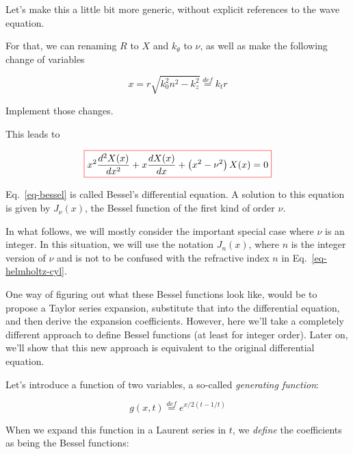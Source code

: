 Let's make this a little bit more generic, without explicit references to the wave equation.

For that, we can renaming $R$ to $X$ and $k_\theta$ to $\nu$, as well as make the following change of variables

\begin{equation}
x = r \sqrt{k_0^2 n^2 - k_z^2} \stackrel{def}{=} k_t r
\end{equation}

\begin{cue}
  Implement those changes.
\end{cue}

This leads to

\begin{equation}
\fbox{$\displaystyle
x^2\frac{d^2 X(x)}{d x^2} + x \frac{d X(x)}{d x} + \left(x ^ 2 - \nu^2 \right)X(x) = 0 \label{eq-bessel}
$}
\end{equation}

Eq.~\ref{eq-bessel} is called Bessel's differential equation. A solution to this equation is given by $J_\nu(x)$, the Bessel function of the first kind of order $\nu$.

In what follows, we will mostly consider the important special case where $\nu$ is an integer. In this situation, we will use the notation $J_n(x)$, where $n$ is the integer version of $\nu$ and is not to be confused with the refractive index $n$ in Eq.~\ref{eq-helmholtz-cyl}.


One way of figuring out what these Bessel functions look like, would be to propose a Taylor series expansion, substitute that into the differential equation, and then derive the expansion coefficients. However, here we'll take a completely different approach to define Bessel functions (at least for integer order). Later on, we'll show that this new approach is equivalent to the original differential equation.

\noindent{}Let's introduce a function of two variables, a so-called \emph{generating function}:

\begin{equation}
g(x,t) \stackrel{def}{=} e^{x/2(t-1/t)} \label{eq-gen-bessel}
\end{equation}

When we expand this function in a Laurent series in $t$, we \emph{define} the coefficients as being the Bessel functions:

